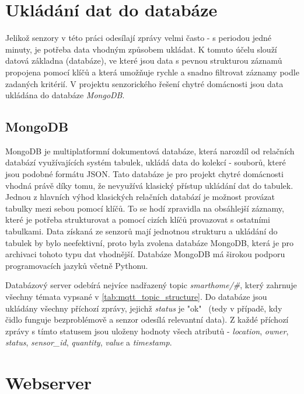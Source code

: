 \section{Ukládání dat do databáze} \label{sec:database}
Jelikož senzory v této práci odesílají zprávy velmi často - s periodou jedné minuty, je potřeba data vhodným způsobem ukládat. K tomuto účelu slouží datová základna (databáze), ve které jsou data s pevnou strukturou záznamů propojena pomocí klíčů a která umožňuje rychle a snadno filtrovat záznamy podle zadaných kritérií. V projektu senzorického řešení chytré domácnosti jsou data ukládána do databáze \textit{MongoDB}.

\subsection*{MongoDB}
MongoDB je multiplatformní dokumentová databáze, která narozdíl od relačních databází využívajících systém tabulek, ukládá data do kolekcí - souborů, které jsou podobné formátu JSON. Tato databáze je pro projekt chytré domácnosti vhodná právě díky tomu, že nevyužívá klasický přístup ukládání dat do tabulek. Jednou z hlavních výhod klasických relačních databází je možnost provázat tabulky mezi sebou pomocí klíčů. To se hodí zpravidla na obsáhlejší záznamy, které je potřeba strukturovat a pomocí cizích klíčů provazovat s ostatními tabulkami. Data získaná ze senzorů mají jednotnou strukturu a ukládání do tabulek by bylo neefektivní, proto byla zvolena databáze MongoDB, která je pro archivaci tohoto typu dat vhodnější. Databáze MongoDB má širokou podporu programovacích jazyků včetně Pythonu. \par
Databázový server odebírá nejvíce nadřazený topic \textit{smarthome/\#}, který zahrnuje všechny témata vypsané v \cref{tab:mqtt_topic_structure}. Do databáze jsou ukládány všechny příchozí zprávy, jejichž \textit{status} je "ok" \ (tedy v případě, kdy čidlo funguje bezproblémově a senzor odesílá relevantní data). Z každé příchozí zprávy s tímto statusem jsou uloženy hodnoty všech atributů - \textit{location}, \textit{owner}, \textit{status}, \textit{sensor\_id}, \textit{quantity}, \textit{value} a \textit{timestamp}. \par

\section{Webserver} \label{sec:webserver}

